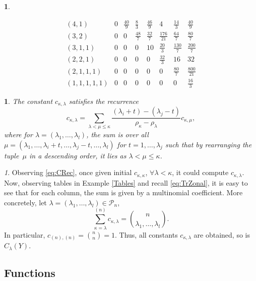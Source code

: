 \documentclass[10pt,oneside,american]{amsart}
\numberwithin{equation}{section}
\numberwithin{figure}{section}
\theoremstyle{definition}
\theoremstyle{remark}
\newtheorem{rem}{\protect\remarkname}[section]
\theoremstyle{plain}
\theoremstyle{definition}
\newtheorem{example}{\protect\examplename}[section]
\theoremstyle{plain}
\newtheorem{thm}{\protect\theoremname}[section]
\providecommand{\examplename}{Example}
\providecommand{\remarkname}{Remark}
\providecommand{\theoremname}{Theorem}
\begin{document}
\begin{example}
\begin{itemize}
\[\begin{array}{c|ccccccc}
\left(4,1\right) & 0 & \frac{40}{9} & \frac{8}{3} & \frac{46}{9} & 4 & \frac{14}{3} & \frac{40}{9}\\
\left(3,2\right) & 0 & 0 & \frac{48}{7} & \frac{32}{7} & \frac{176}{21} & \frac{64}{7} & \frac{80}{7}\\
\left(3,1,1\right) & 0 & 0 & 0 & 10 & \frac{20}{3} & \frac{130}{7} & \frac{200}{7}\\
\left(2,2,1\right) & 0 & 0 & 0 & 0 & \frac{32}{3} & 16 & 32\\
\left(2,1,1,1\right) & 0 & 0 & 0 & 0 & 0 & \frac{80}{7} & \frac{800}{21}\\
\left(1,1,1,1,1\right) & 0 & 0 & 0 & 0 & 0 & 0 & \frac{16}{3}
\end{array}
\]
\end{itemize}
\end{example}
\begin{thm}
The constant $c_{\kappa,\lambda}$ satisfies the recurrence \cite[pp.~234, eq.~14]{Muirhead}
\begin{equation}
c_{\kappa,\lambda}=\sum_{\lambda<\mu\leq\kappa}\frac{\left(\lambda_{i}+t\right)-\left(\lambda_{j}-t\right)}{\rho_{\kappa}-\rho_{\lambda}}c_{\kappa,\mu},\label{eq:CRec}
\end{equation}
where for $\lambda=\left(\lambda_{1},\ldots,\lambda_{l}\right)$,
the sum is over all $\mu=\left(\lambda_{1},\ldots,\lambda_{i}+t,\ldots,\lambda_{j}-t,\ldots,\lambda_{l}\right)$
for $t=1,\ldots,\lambda_{j}$ such that by rearranging the tuple~$\mu$
in a descending order, it lies as $\lambda<\mu\leq\kappa$.
\end{thm}
\begin{rem}
Observing \eqref{eq:CRec}, once given initial $c_{\kappa,\kappa}$,
$\forall\lambda<\kappa$, it could compute $c_{\kappa,\lambda}$.
Now, observing tables in Example \ref{Tables} and recall \eqref{eq:TrZonal},
it is easy to see that for each column, the sum is given by a multinomial
coefficient. More concretely, let $\lambda=\left(\lambda_{1},\ldots,\lambda_{l}\right)\in\mathcal{P}_{n}$,
\begin{equation}
  \sum_{\kappa=\lambda}^{\left(n\right)}c_{\kappa,\lambda}=\binom{n}{\lambda_{1},\ldots,\lambda_{l}}.\label{eq:CInitial}
\end{equation}
In particular, $c_{\left(n\right),\left(n\right)}=\binom{n}{n}=1$.
Thus, all constants $c_{\kappa,\lambda}$ are obtained, so is $C_{\lambda}(Y)$. 
\end{rem}

\subsection{Functions}
\end{document}
